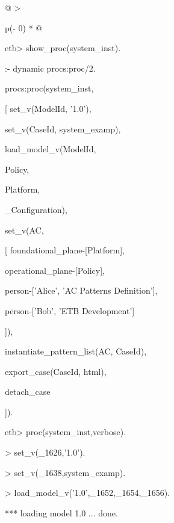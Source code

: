 \documentclass[12pt,twoside,a4paper]{article}
\begin{document}
\begin{longtable}[]{@{}
  >{\raggedright\arraybackslash}p{(\columnwidth - 0\tabcolsep) * }@{}}
\toprule
\begin{minipage}[b]{\linewidth}\raggedright
etb\textgreater{} show\_proc(system\_inst).

:- dynamic procs:proc/2.

procs:proc(system\_inst,

{[} set\_v(ModelId, '1.0'),

set\_v(CaseId, system\_examp),

load\_model\_v(ModelId,

Policy,

Platform,

\_Configuration),

set\_v(AC,

{[} foundational\_plane-{[}Platform{]},

operational\_plane-{[}Policy{]},

person-{[}'Alice', 'AC Patterns Definition'{]},

person-{[}'Bob', 'ETB Development'{]}

{]}),

instantiate\_pattern\_list(AC, CaseId),

export\_case(CaseId, html),

detach\_case

{]}).

etb\textgreater{} proc(system\_inst,verbose).

\textgreater{} set\_v(\_1626,'1.0').

\textgreater{} set\_v(\_1638,system\_examp).

\textgreater{} load\_model\_v('1.0',\_1652,\_1654,\_1656).

*** loading model 1.0 ... done.


\end{minipage}
\end{longtable}
\end{document}
